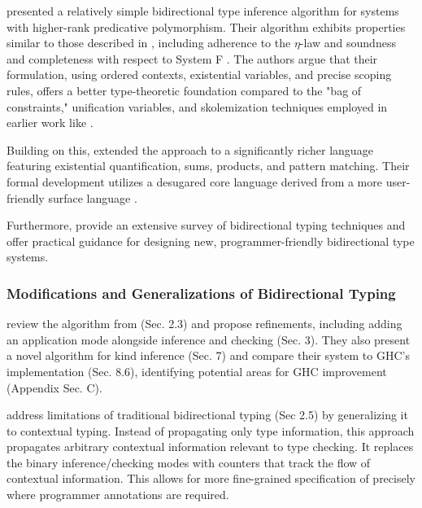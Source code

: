 \cite{dunfield-complete-2013} presented a relatively simple bidirectional type inference algorithm for systems with higher-rank predicative polymorphism. Their algorithm exhibits properties similar \cite[Fig. 15]{dunfield-complete-2013} to those described in \cite[Sec.~6]{jones-practical-2007}, including adherence to the $\eta$-law \cite[Ch.~4]{selinger-lecture-2013} and soundness and completeness with respect to System F \cite[Ch.~8]{selinger-lecture-2013}. The authors argue that their formulation, using ordered contexts, existential variables, and precise scoping rules, offers a better type-theoretic foundation compared to the "bag of constraints," unification variables, and skolemization techniques employed in earlier work like \cite{jones-practical-2007}.

Building on this, \citeauthor{dunfield-sound-2019} \cite{dunfield-sound-2019} extended the approach to a significantly richer language featuring existential quantification, sums, products, and pattern matching. Their formal development utilizes a desugared core language \cite[Fig. 11]{dunfield-sound-2019} derived from a more user-friendly surface language \cite[Fig. 1]{dunfield-sound-2019}.

Furthermore, \cite{dunfield-bidirectional-2020} provide an extensive survey of bidirectional typing techniques and offer practical guidance for designing new, programmer-friendly bidirectional type systems.

\subsubsection{Modifications and Generalizations of Bidirectional Typing}

\cite{xie-higher-rank} review the algorithm from \cite{dunfield-complete-2013} (Sec. 2.3) and propose refinements, including adding an application mode alongside inference and checking (Sec. 3). They also present a novel algorithm for kind inference (Sec. 7) and compare their system to GHC's implementation (Sec. 8.6), identifying potential areas for GHC improvement (Appendix Sec. C).

\cite{xue-contextual-2024} address limitations of traditional bidirectional typing (Sec 2.5) by generalizing it to contextual typing. Instead of propagating only type information, this approach propagates arbitrary contextual information relevant to type checking. It replaces the binary inference/checking modes with counters that track the flow of contextual information. This allows for more fine-grained specification of precisely where programmer annotations are required.

